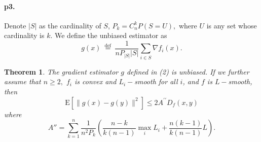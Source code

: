 \documentclass[12pt,a4paper]{article}
\newtheorem*{theorem}{Theorem}
\begin{document}
\paragraph{p3.}
Denote $|S|$ as the cardinality of $S$,  $P_k = C_n^kP(S=U),$ where $U$ is any set whose cardinality is $k$.
We define the unbiased estimator as
\begin{equation}
	g(x) \stackrel{\text { def }}{=} \frac{1}{nP_{|S|}|S|} \sum_{i \in S} \nabla f_{i}(x).
\end{equation}
\begin{theorem}
	The gradient estimator $g$ defined in (2) is unbiased. If we further assume that $n\geq 2,$ $f_i$ is
	convex and $L_i-$smooth for all $i$, and $f$ is $L-$smooth, then 
	\begin{equation}
		\mathrm{E}\left[\|g(x)-g(y)\|^{2}\right] \leq 2 A^{\prime \prime} D_{f}(x, y)
	\end{equation}
where 
\begin{equation}
	A'' =\sum_{k=1}^n \frac{1}{n^2P_k}\left(\frac{n-k}{k(n-1)} \max _{i} L_{i}+\frac{n(k-1)}{k(n-1)} L\right).
\end{equation}
\end{theorem}
\end{document}
